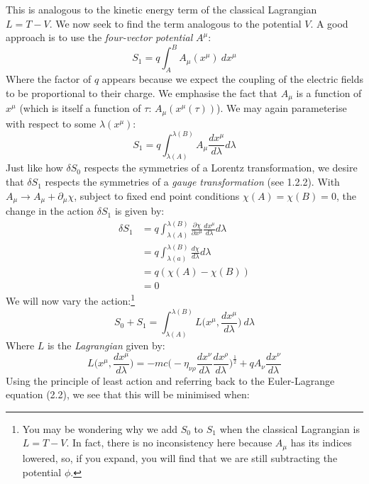 \documentclass[a4paper]{article}
\numberwithin{equation}{section}
\begin{document}
This is analogous to the kinetic energy term of the classical Lagrangian $L=T-V$. We now seek to find the term analogous to the potential $V$. A good approach is to use the \textit{four-vector potential} $A^\mu$:
\begin{equation}
S_1=q\int_A^B A_\mu(x^\mu) \ d x^\mu
\end{equation}
Where the factor of $q$ appears because we expect the coupling of the electric fields to be proportional to their charge. We emphasise the fact that $A_\mu$ is a function of $x^\mu$ (which is itself a function of $\tau$: $A_\mu(x^\mu(\tau))$). We may again parameterise with respect to some $\lambda(x^\mu)$:
\begin{equation}
S_1=q\int_{\lambda(A)}^{\lambda(B)}A_\mu \frac{d x^\mu}{d \lambda} d \lambda
\end{equation}
Just like how $\delta S_0$ respects the symmetries of a Lorentz transformation, we desire that $\delta S_1$ respects the symmetries of a \textit{gauge transformation} (see 1.2.2). With $A_\mu \rightarrow A_\mu + \partial_\mu \chi$, subject to fixed end point conditions $\chi(A) = \chi(B) = 0$, the change in the action $\delta S_1$ is given by:
\begin{align*}
\delta S_1 &= q \int_{\lambda(A)}^{\lambda(B)} \frac{\partial \chi}{\partial x^\mu}\frac{d x^\mu}{d \lambda} d\lambda \\
&=q\int_{\lambda(a)}^{\lambda(B)}\frac{d \chi}{d \lambda} d \lambda \\ 
&=q(\chi(A)-\chi(B)) \\
&=0
\end{align*}
We will now vary the action:\footnote{You may be wondering why we add $S_0$ to $S_1$ when the classical Lagrangian is $L=T-V$. In fact, there is no inconsistency here because $A_\mu$ has its indices lowered, so, if you expand, you will find that we are still subtracting the potential $\phi$.}
\begin{equation}
S_0+S_1= \int_{\lambda(A)}^{\lambda(B)}L\bigg(x^\mu, \frac{dx^\mu}{d\lambda}\bigg) \ d\lambda
\end{equation}
Where $L$ is the \textit{Lagrangian} given by:
\begin{equation}
L\bigg(x^\mu, \frac{dx^\mu}{d\lambda} \bigg)=-mc\bigg(-\eta_{\nu \rho} \frac{dx^\nu}{d\lambda}\frac{dx^\rho}{d\lambda}\bigg)^\frac{1}{2}+qA_\nu \frac{dx^\nu}{d\lambda}
\end{equation}
Using the principle of least action and referring back to the Euler-Lagrange equation (2.2), we see that this will be minimised when:
\end{document}
